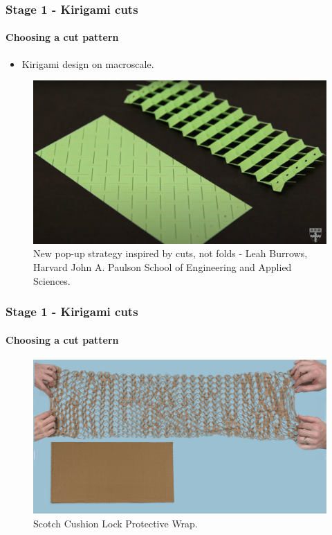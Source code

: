 \documentclass[
	10pt, %
]{beamer}
\begin{document}
\begin{frame}
	\frametitle{Stage 1 - Kirigami cuts}
	\framesubtitle{Choosing a cut pattern}

	\begin{itemize}
		\item Kirigami design on macroscale.
	\end{itemize}
	\begin{figure}
		\includegraphics[width=0.6\linewidth]{figures/kirigami_pattern_inspiration.png}
		\caption{New pop-up strategy inspired by cuts, not folds - Leah Burrows, Harvard John A. Paulson School of Engineering and Applied Sciences.}
	\end{figure}	

	
\end{frame}



\begin{frame}
	\frametitle{Stage 1 - Kirigami cuts}
	\framesubtitle{Choosing a cut pattern}

	\begin{figure}
		\includegraphics[width=0.8\linewidth]{figures/cushion_lock.jpg}
		\caption{Scotch Cushion Lock Protective Wrap.}
	\end{figure}	
	
\end{frame}
\end{document}
